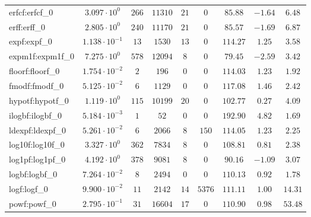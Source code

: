\begin{tabular}{|l|c|c|c|c|c|c|c|c|}
erfcf:erfcf\_0               & $ 3.097 \cdot 10^{0}  $ & $ 266    $ & $ 11310  $ & $ 21  $ & $ 0    $ & $ 85.88       $ & $ -1.64   $ & $ 6.48    $ \\
erff:erff\_0                 & $ 2.805 \cdot 10^{0}  $ & $ 240    $ & $ 11170  $ & $ 21  $ & $ 0    $ & $ 85.57       $ & $ -1.69   $ & $ 6.87    $ \\
expf:expf\_0                 & $ 1.138 \cdot 10^{-1} $ & $ 13     $ & $ 1530   $ & $ 13  $ & $ 0    $ & $ 114.27      $ & $ 1.25    $ & $ 3.58    $ \\
expm1f:expm1f\_0             & $ 7.275 \cdot 10^{0}  $ & $ 578    $ & $ 12094  $ & $ 8   $ & $ 0    $ & $ 79.45       $ & $ -2.59   $ & $ 3.42    $ \\
floorf:floorf\_0             & $ 1.754 \cdot 10^{-2} $ & $ 2      $ & $ 196    $ & $ 0   $ & $ 0    $ & $ 114.03      $ & $ 1.23    $ & $ 1.92    $ \\
fmodf:fmodf\_0               & $ 5.125 \cdot 10^{-2} $ & $ 6      $ & $ 1129   $ & $ 0   $ & $ 0    $ & $ 117.08      $ & $ 1.46    $ & $ 2.42    $ \\
hypotf:hypotf\_0             & $ 1.119 \cdot 10^{0}  $ & $ 115    $ & $ 10199  $ & $ 20  $ & $ 0    $ & $ 102.77      $ & $ 0.27    $ & $ 4.09    $ \\
ilogbf:ilogbf\_0             & $ 5.184 \cdot 10^{-3} $ & $ 1      $ & $ 52     $ & $ 0   $ & $ 0    $ & $ 192.90      $ & $ 4.82    $ & $ 1.69    $ \\
ldexpf:ldexpf\_0             & $ 5.261 \cdot 10^{-2} $ & $ 6      $ & $ 2066   $ & $ 8   $ & $ 150  $ & $ 114.05      $ & $ 1.23    $ & $ 2.25    $ \\
log10f:log10f\_0             & $ 3.327 \cdot 10^{0}  $ & $ 362    $ & $ 7834   $ & $ 8   $ & $ 0    $ & $ 108.81      $ & $ 0.81    $ & $ 2.38    $ \\
log1pf:log1pf\_0             & $ 4.192 \cdot 10^{0}  $ & $ 378    $ & $ 9081   $ & $ 8   $ & $ 0    $ & $ 90.16       $ & $ -1.09   $ & $ 3.07    $ \\
logbf:logbf\_0               & $ 7.264 \cdot 10^{-2} $ & $ 8      $ & $ 2494   $ & $ 0   $ & $ 0    $ & $ 110.13      $ & $ 0.92    $ & $ 1.78    $ \\
logf:logf\_0                 & $ 9.900 \cdot 10^{-2} $ & $ 11     $ & $ 2142   $ & $ 14  $ & $ 5376 $ & $ 111.11      $ & $ 1.00    $ & $ 14.31   $ \\
powf:powf\_0                 & $ 2.795 \cdot 10^{-1} $ & $ 31     $ & $ 16604  $ & $ 17  $ & $ 0    $ & $ 110.90      $ & $ 0.98    $ & $ 53.48   $ \\

\end{tabular}
